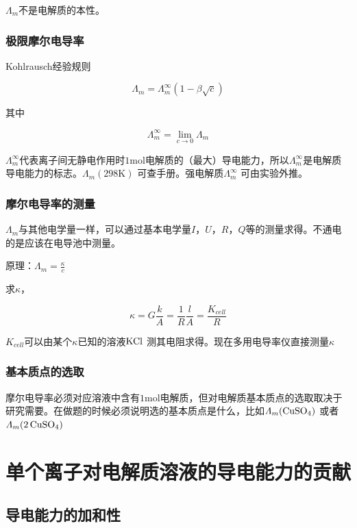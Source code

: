\documentclass[a4paper]{ctexrep}
\newcommand{\mol}{\mathrm{mol}}
\begin{document}
        $\varLambda_m$不是电解质的本性。

        \subsubsection{极限摩尔电导率}

        Kohlrausch经验规则

        \[
            \varLambda_m = \varLambda_m^\infty (1 - \beta \sqrt{c})
        \]

        其中

        \[
            \varLambda_m^\infty = \lim_{c \rightarrow 0} \varLambda_m   
        \]

        $\varLambda_m^\infty$代表离子间无静电作用时$1 \mol$电解质的（最大）导电能力，所以$\Lambda_m ^\infty$是电解质导电能力的标志。$\varLambda_m (298\mathrm{K})$ 可查手册。强电解质$\varLambda_m^\infty$ 可由实验外推。

        \subsubsection{摩尔电导率的测量}

        $\varLambda_m$与其他电学量一样，可以通过基本电学量$I$，$U$，$R$，$Q$等的测量求得。不通电的是应该在电导池中测量。

        原理：$\varLambda_m = \frac{\kappa}{c} $

        求$\kappa$，
        
        \[
            \kappa = G \frac{k}{A} = \frac{1}{R} \frac{l}{A} = \frac{K_{cell}}{R}  
        \]

        $K_{cell}$可以由某个$\kappa$已知的溶液$\ce{KCl}$ 测其电阻求得。现在多用电导率仪直接测量$\kappa$

        \subsubsection{基本质点的选取}

        摩尔电导率必须对应溶液中含有$1 \mol$电解质，但对电解质基本质点的选取取决于研究需要。在做题的时候必须说明选的基本质点是什么，比如$\varLambda_m (\ce{CuSO4})$ 或者 $\varLambda_m (\ce{2CuSO4})$

        \section{单个离子对电解质溶液的导电能力的贡献}

        \subsection{导电能力的加和性}
\end{document}
